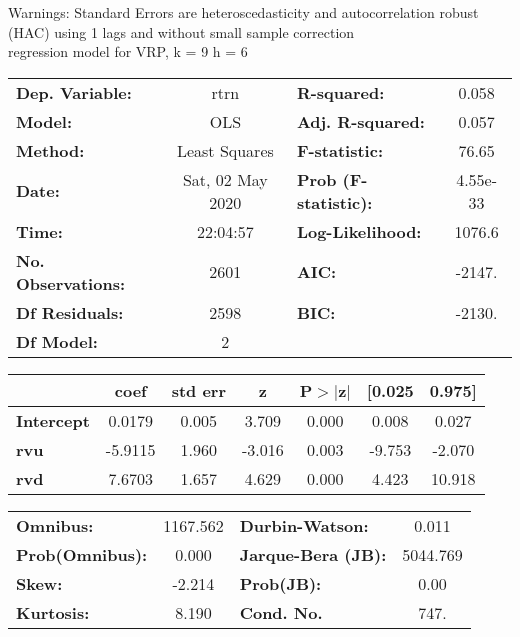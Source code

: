 Warnings: \newline
 [1] Standard Errors are heteroscedasticity and autocorrelation robust (HAC) using 1 lags and without small sample correction\\ 

regression model for VRP, k = 9 h = 6\begin{center}
\begin{tabular}{lclc}
\toprule
\textbf{Dep. Variable:}    &       rtrn       & \textbf{  R-squared:         } &     0.058   \\
\textbf{Model:}            &       OLS        & \textbf{  Adj. R-squared:    } &     0.057   \\
\textbf{Method:}           &  Least Squares   & \textbf{  F-statistic:       } &     76.65   \\
\textbf{Date:}             & Sat, 02 May 2020 & \textbf{  Prob (F-statistic):} &  4.55e-33   \\
\textbf{Time:}             &     22:04:57     & \textbf{  Log-Likelihood:    } &    1076.6   \\
\textbf{No. Observations:} &        2601      & \textbf{  AIC:               } &    -2147.   \\
\textbf{Df Residuals:}     &        2598      & \textbf{  BIC:               } &    -2130.   \\
\textbf{Df Model:}         &           2      & \textbf{                     } &             \\
\bottomrule
\end{tabular}
\begin{tabular}{lcccccc}
                   & \textbf{coef} & \textbf{std err} & \textbf{z} & \textbf{P$> |$z$|$} & \textbf{[0.025} & \textbf{0.975]}  \\
\midrule
\textbf{Intercept} &       0.0179  &        0.005     &     3.709  &         0.000        &        0.008    &        0.027     \\
\textbf{rvu}       &      -5.9115  &        1.960     &    -3.016  &         0.003        &       -9.753    &       -2.070     \\
\textbf{rvd}       &       7.6703  &        1.657     &     4.629  &         0.000        &        4.423    &       10.918     \\
\bottomrule
\end{tabular}
\begin{tabular}{lclc}
\textbf{Omnibus:}       & 1167.562 & \textbf{  Durbin-Watson:     } &    0.011  \\
\textbf{Prob(Omnibus):} &   0.000  & \textbf{  Jarque-Bera (JB):  } & 5044.769  \\
\textbf{Skew:}          &  -2.214  & \textbf{  Prob(JB):          } &     0.00  \\
\textbf{Kurtosis:}      &   8.190  & \textbf{  Cond. No.          } &     747.  \\
\bottomrule
\end{tabular}
\end{center}

